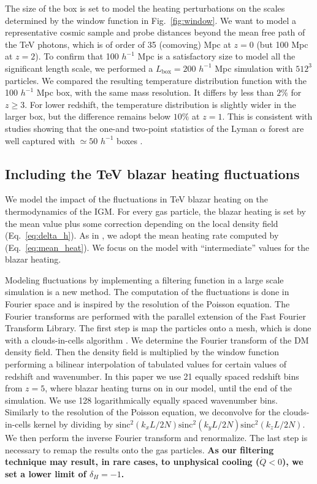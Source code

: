 \documentclass[numberedappendix]{emulateapj}
\newcommand\ALc[1]{{\color{red} \bf #1}} %
\begin{document}
{The size of the box is set to model the heating perturbations on the scales determined by the window function in Fig.~\ref{fig:window}. We want to model a representative cosmic sample and probe distances beyond the mean free path of the TeV photons, which is of order of 35 (comoving) Mpc at $z=0$ (but 100 Mpc at $z=2$). To confirm that 100 $h^{-1}$ Mpc is a satisfactory size to model all the significant length scale, we performed a $L_\mathrm{box}=200 $ $h^{-1}$ Mpc simulation with $512^3$ particles. We compared the resulting temperature distribution function with the 100 $h^{-1}$ Mpc box, with the same mass resolution. It differs by less than $2\%$ for $z\geqslant 3$. For lower redshift, the temperature distribution is slightly wider in the larger box, but the difference remains below $10\%$ at $z=1$. This is consistent with studies showing that the one-and two-point statistics of the Lyman $\alpha$ forest are well captured with $\simeq 50$ $h^{-1}$ boxes \citep{2007MNRAS.374..196R,2009MNRAS.398L..26B}.
\subsection{Including the TeV blazar heating fluctuations}
We model the impact of the fluctuations in TeV blazar heating on the thermodynamics of the IGM. For every gas particle, the blazar heating is set by the mean value plus some correction depending on the local density field (Eq.~\eqref{eq:delta_h}). As in \citet{2012MNRAS.423..149P}, we adopt the mean heating rate computed by \citet{2012ApJ...752...23C} (Eq.~\eqref{eq:mean_heat}). We focus on the model with ``intermediate'' values for the blazar heating.

Modeling fluctuations by implementing a filtering function in a large scale simulation is a new method. The computation of the fluctuations is done in Fourier space and is inspired by the resolution of the Poisson equation. The Fourier transforms are performed with the parallel extension of the Fast Fourier Transform Library. The first step is map the particles onto a mesh, which is done with a clouds-in-cells algorithm \citep{1981csup.book.....H}. We determine the Fourier transform of the DM density field. Then the density field is multiplied by the window function performing a bilinear interpolation of tabulated values for certain values of redshift and wavenumber. In this paper we use 21 equally spaced redshift bins from $z=5$, where blazar heating turns on in our model, until the end of the simulation. We use 128 logarithmically equally spaced wavenumber bins. Similarly to the resolution of the Poisson equation, we deconvolve for the clouds-in-cells kernel by dividing by $\mathrm{sinc}^2(k_x L/2N)\mathrm{sinc}^2(k_y L/2N)\mathrm{sinc}^2(k_z L/2N)$. We then perform the inverse Fourier transform and renormalize. The last step is necessary to remap the results onto the gas particles. \ALc{As our filtering technique may result, in rare cases, to unphysical cooling ($\dot{Q}< 0$), we set a lower limit of  $\delta_H =-1$.}
}
\end{document}
